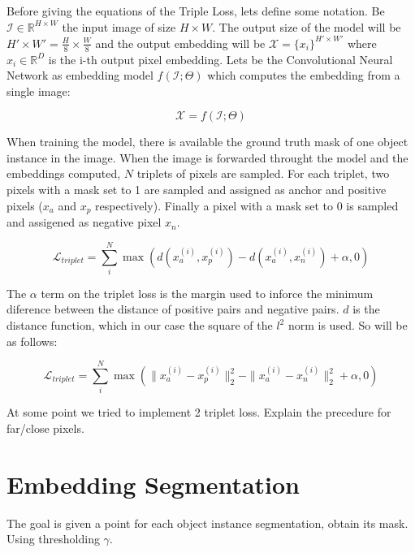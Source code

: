 Before giving the equations of the Triple Loss, lets define some notation.
Be $\mathcal{I} \in \mathbb{R}^{H \times W}$ the input image of size $H \times W$.
The output size of the model will be $H' \times W' = \frac{H}{8} \times \frac{W}{8}$ and the output embedding will be $\mathcal{X} = \{x_i\}^{H' \times W'}$ where $x_i \in \mathbb{R}^D$ is the i-th output pixel embedding.
Lets be the Convolutional Neural Network as embedding model $f(\mathcal{I}; \Theta)$ which computes the embedding from a single image:

\begin{equation}
  \mathcal{X} = f(\mathcal{I}; \Theta)
\end{equation}

When training the model, there is available the ground truth mask of one object instance in the image. When the image is forwarded throught the model and the embeddings computed, $N$ triplets of pixels are sampled. For each triplet, two pixels with a mask set to 1 are sampled and assigned as anchor and positive pixels ($x_a$ and $x_p$ respectively). Finally a pixel with a mask set to 0 is sampled and assigened as negative pixel $x_n$.

\begin{equation}
  \label{eq:triplet_loss_1}
  \mathcal{L}_{triplet} = \sum_i^N \max \left( d(x_a^{(i)}, x_p^{(i)}) - d(x_a^{(i)}, x_n^{(i)})  + \alpha, 0 \right)
\end{equation}

The $\alpha$ term on the triplet loss is the margin used to inforce the minimum diference between the distance of positive pairs and negative pairs. $d$ is the distance function, which in our case the square of the $l^2$ norm is used. So  will be as follows:

\begin{equation}
  \label{eq:triplet_loss_2}
  \mathcal{L}_{triplet} =
	\sum_i^N \max \left(
		\|x_a^{(i)} - x_p^{(i)}\|^2_2 - \|x_a^{(i)} - x_n^{(i)}\|_2^2  + \alpha,
		0 \right)
\end{equation}


At some point we tried to implement 2 triplet loss.
Explain the precedure for far/close pixels.

\section{Embedding Segmentation}

The goal is given a point for each object instance segmentation, obtain its mask.
Using thresholding $\gamma$.



